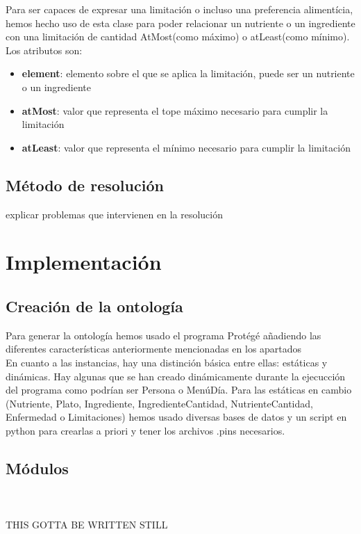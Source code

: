 \documentclass[12]{article}
\begin{document}
Para ser capaces de expresar una limitación o incluso una preferencia alimentícia, hemos hecho uso de esta clase para poder relacionar un nutriente o un ingrediente con una limitación de cantidad AtMost(como máximo) o atLeast(como mínimo).
\\

Los atributos son:
\begin{itemize}
\item \textbf{element}: elemento sobre el que se aplica la limitación, puede ser un nutriente o un ingrediente
\item \textbf{atMost}: valor que representa el tope máximo necesario para cumplir la limitación
\item \textbf{atLeast}: valor que representa el mínimo necesario para cumplir la limitación
\end{itemize}




\subsection{Método de resolución}

 explicar problemas que intervienen en la resolución
\section{Implementación}

\subsection{Creación de la ontología}
Para generar la ontología hemos usado el programa Protégé añadiendo las diferentes características anteriormente mencionadas en los apartados%
\\
En cuanto a las instancias, hay una distinción básica entre ellas: estáticas y dinámicas. Hay algunas que se han creado dinámicamente durante la ejecucción del programa como podrían ser Persona o MenúDía. Para las estáticas en cambio (Nutriente, Plato, Ingrediente, IngredienteCantidad, NutrienteCantidad, Enfermedad o Limitaciones) hemos usado diversas bases de datos y un script en python para crearlas a priori y tener los archivos .pins necesarios. 
\subsection{Módulos}
\\
\\
THIS GOTTA BE WRITTEN STILL\\
\\
\\
\end{document}
